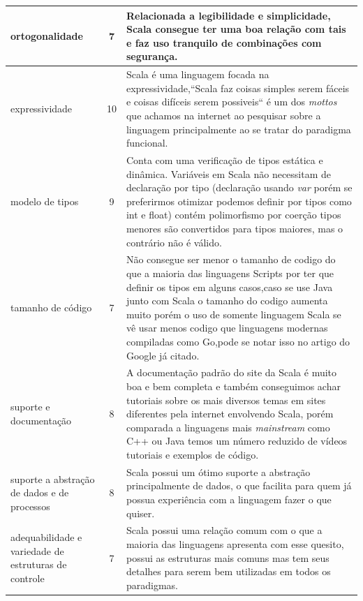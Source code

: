 \documentclass[rel-mlp]{iiufrgs}
\begin{document}
\begin{longtable}[c]{|p{4cm}|c|p{8.8cm}|}
\\\hline
ortogonalidade                  & 7 & Relacionada a legibilidade e simplicidade, Scala consegue ter uma boa relação com tais e faz uso tranquilo de combinações com segurança. 
\\\hline
expressividade                  & 10 &  Scala é uma linguagem focada na expressividade,``Scala faz coisas simples serem fáceis e coisas difíceis serem possiveis`` é um dos \textit{mottos} que achamos na internet ao pesquisar sobre a linguagem principalmente ao se tratar do paradigma funcional. 
\\\hline
modelo de tipos                 & 9 & Conta com uma verificação de tipos estática e dinâmica. Variáveis em Scala não necessitam de declaração por tipo (declaração usando \textit{var} porém se preferirmos otimizar podemos definir por tipos como int e float) contém polimorfismo por coerção tipos menores são convertidos para tipos maiores, mas o contrário não é válido.
\\\hline
tamanho de código               & 7 & Não consegue ser menor o tamanho de codigo do que a maioria das linguagens Scripts por ter que definir os tipos em alguns casos,caso se use Java junto com Scala o tamanho do codigo aumenta muito porém o uso de somente linguagem Scala se vê usar menos codigo que linguagens modernas compiladas como Go,pode se notar isso no artigo do Google já citado. \\\hline
suporte e documentação          & 8 & A documentação padrão do site da Scala é muito boa e bem completa e também conseguimos achar tutoriais sobre os mais diversos temas em sites diferentes pela internet envolvendo Scala, porém comparada a linguagens mais \textit{mainstream} como C++ ou Java temos um número reduzido de vídeos tutoriais e exemplos de código.
\\\hline
suporte a abstração de dados 
e de processos                  & 8 & Scala possui um ótimo suporte a abstração principalmente de dados, o que facilita para quem já possua experiência com a linguagem fazer o que quiser.
\\\hline
adequabilidade e variedade 
de estruturas de controle       & 7 & Scala possui uma relação comum com o que a maioria das linguagens apresenta com esse quesito, possui as estruturas mais comuns mas tem seus detalhes para serem bem utilizadas em todos os paradigmas.
\\\hline

\end{longtable}
\end{document}
